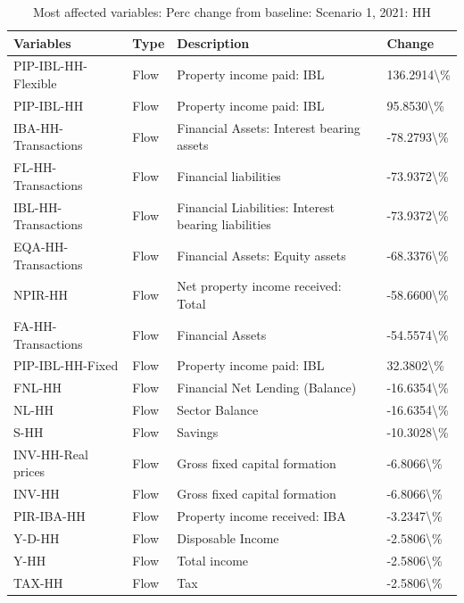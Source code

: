 \documentclass[
]{book}
\begin{document}
\begin{table}

\caption{\label{tab:most-affected-scenario-1-perc-2020-HH}Most affected variables: Perc change from baseline: Scenario 1, 2021: HH}
\centering
\fontsize{10}{12}\selectfont
\begin{tabular}[t]{l|l|l|l}
\hline
Variables & Type & Description & Change\\
\hline
PIP-IBL-HH-Flexible & Flow & Property income paid: IBL & 136.2914\textbackslash{}\%\\
\hline
PIP-IBL-HH & Flow & Property income paid: IBL & 95.8530\textbackslash{}\%\\
\hline
IBA-HH-Transactions & Flow & Financial Assets: Interest bearing assets & -78.2793\textbackslash{}\%\\
\hline
FL-HH-Transactions & Flow & Financial liabilities & -73.9372\textbackslash{}\%\\
\hline
IBL-HH-Transactions & Flow & Financial Liabilities: Interest bearing liabilities & -73.9372\textbackslash{}\%\\
\hline
EQA-HH-Transactions & Flow & Financial Assets: Equity assets & -68.3376\textbackslash{}\%\\
\hline
NPIR-HH & Flow & Net property income received: Total & -58.6600\textbackslash{}\%\\
\hline
FA-HH-Transactions & Flow & Financial Assets & -54.5574\textbackslash{}\%\\
\hline
PIP-IBL-HH-Fixed & Flow & Property income paid: IBL & 32.3802\textbackslash{}\%\\
\hline
FNL-HH & Flow & Financial Net Lending (Balance) & -16.6354\textbackslash{}\%\\
\hline
NL-HH & Flow & Sector Balance & -16.6354\textbackslash{}\%\\
\hline
S-HH & Flow & Savings & -10.3028\textbackslash{}\%\\
\hline
INV-HH-Real prices & Flow & Gross fixed capital formation & -6.8066\textbackslash{}\%\\
\hline
INV-HH & Flow & Gross fixed capital formation & -6.8066\textbackslash{}\%\\
\hline
PIR-IBA-HH & Flow & Property income received: IBA & -3.2347\textbackslash{}\%\\
\hline
Y-D-HH & Flow & Disposable Income & -2.5806\textbackslash{}\%\\
\hline
Y-HH & Flow & Total income & -2.5806\textbackslash{}\%\\
\hline
TAX-HH & Flow & Tax & -2.5806\textbackslash{}\%\\

\end{tabular}
\end{table}
\end{document}
